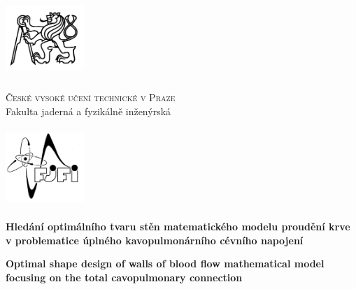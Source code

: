\def\documentdate{21. kv\v{e}tna 2023}


\pagestyle{empty}
{\centering

\noindent %
\begin{minipage}[c]{3cm}%
\noindent \begin{center}
\includegraphics[width=3cm,height=3cm,keepaspectratio]{Images/TITLE/cvut}
\par\end{center}%
\end{minipage}%
\begin{minipage}[c]{0.6\linewidth}%
\begin{center}
\textsc{\large{}České vysoké učení technické v Praze}{\large{}}\\
{\large{}Fakulta jaderná a fyzikálně inženýrská}
\par\end{center}%
\end{minipage}%
\begin{minipage}[c]{3cm}%
\noindent \begin{center}
\includegraphics[width=3cm,height=3cm,keepaspectratio]{Images/TITLE/fjfi}
\par\end{center}%
\end{minipage}

\vspace{3cm}

\textbf{\huge{}Hledání optimálního tvaru stěn matematického modelu proudění krve v problematice úplného kavopulmonárního cévního napojení}{\huge\par}

\vspace{1cm}

%
\textbf{\huge{}Optimal shape design of walls of blood flow mathematical model focusing on the total cavopulmonary connection}{\huge\par}

}
